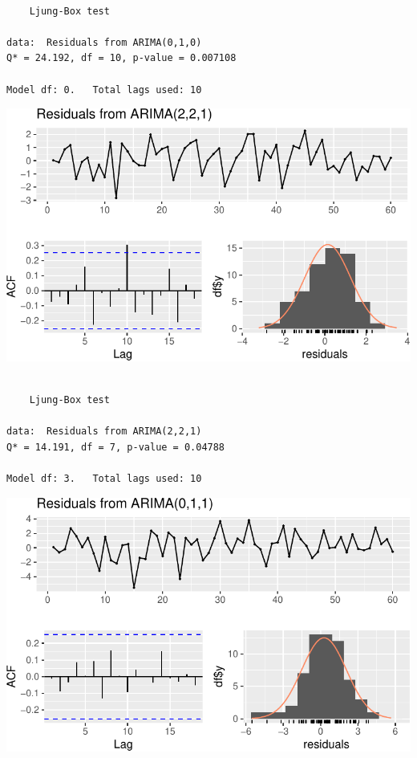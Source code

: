 \documentclass[
  letterpaper,
  DIV=11,
  numbers=noendperiod]{scrartcl}
\begin{document}
\begin{verbatim}

    Ljung-Box test

data:  Residuals from ARIMA(0,1,0)
Q* = 24.192, df = 10, p-value = 0.007108

Model df: 0.   Total lags used: 10
\end{verbatim}

\includegraphics{Smith_Gabrielle_EDS222Final_files/figure-pdf/unnamed-chunk-13-1.pdf}

\begin{verbatim}

    Ljung-Box test

data:  Residuals from ARIMA(2,2,1)
Q* = 14.191, df = 7, p-value = 0.04788

Model df: 3.   Total lags used: 10
\end{verbatim}

\includegraphics{Smith_Gabrielle_EDS222Final_files/figure-pdf/unnamed-chunk-14-1.pdf}
\end{document}
